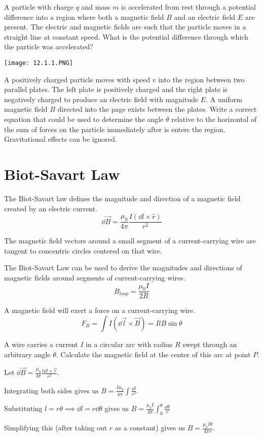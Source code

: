 \documentclass[../em.tex]{subfiles}
\begin{document}
\ex A particle with charge $q$ and mass $m$ is accelerated from rest through a potential difference into a region where both a magnetic field $B$ and an electric field $E$ are present.
The electric and magnetic fields are such that the particle moves in a straight line at constant speed. What is the potential difference through which the particle was accelerated?

\ex \begin{center}
    \texttt{[image: 12.1.1.PNG]}
\end{center}
A positively charged particle moves with speed $v$ into the region between two parallel plates. The left plate is positively charged and the right plate is negatively charged to produce an electric field 
with magnitude $E$. A uniform magnetic field $B$ directed into the page exists between the plates. Write a correct equation that could be used to determine the angle $\theta$ relative to the horizontal of the sum of forces on the particle immediately after is enters the region. Gravitational effects can be ignored.

\section{Biot-Savart Law}
The Biot-Savart law defines the magnitude and direction of a magnetic field created by an electric current.
\[ \dd \vec{B} = \frac{\mu_0}{4\pi} \frac{I(\dd l\times \hat{r})}{r^2} \]

The magnetic field vectors around a small segment of a current-carrying wire are tangent to concentric circles centered on that wire.

The Biot-Savart Law can be used to derive the magnitudes and directions of magnetic fields around segments of current-carrying wires.
\[ B_{loop} = \frac{\mu_0 I}{2R} \]

A magnetic field will exert a force on a current-carrying wire.
\[ F_B = \int I(\dd \vec{l}\times \vec{B}) = IlB\sin\theta \]

\begin{example}
    A wire carries a current $I$ in a circular arc with radius $R$ swept through an arbitrary angle $\theta$. Calculate the magnetic field at the center of this arc at point $P$.

    Let $\dd \vec{B}=\frac{\mu_0}{4\pi}\frac{t\dd l\times \vec{r}}{r^2}$.

    Integrating both sides gives us $B=\frac{I\mu_0}{4\pi}\int \frac{\dd l}{r^2}$.
    
    Substituting $l=r\theta \implies \dd l = r\dd \theta$ gives us $B=\frac{\mu_0I}{4\pi}\int_0^{\theta} \frac{\dd \theta}{r}$

    Simplifying this (after taking out $r$ as a constant) gives us $B=\frac{\mu_0I\theta}{4\pi r}$.
\end{example}
\end{document}
